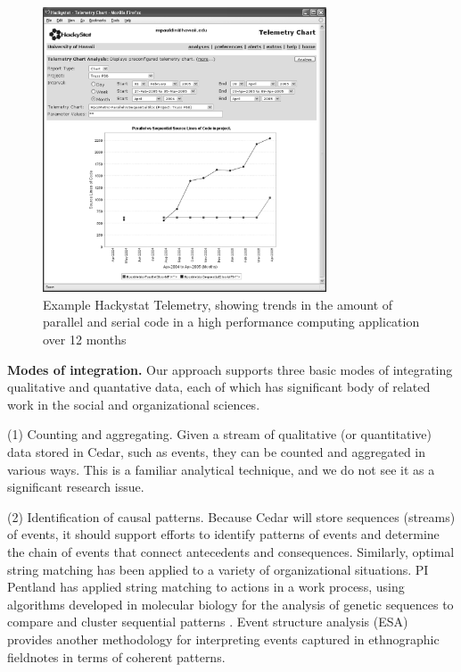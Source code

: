 \begin{figure}[ht]
  \centering
  \includegraphics[width=0.75\textwidth]{parallelsloc.eps}
  \caption{Example Hackystat Telemetry, showing trends in the amount of parallel and serial code 
in a high performance computing application over 12 months}
  \label{fig:telemetry}
\end{figure}

{\bf Modes of integration.}  Our approach supports three basic modes of
integrating qualitative and quantative data, each of which has significant
body of related work in the social and organizational sciences.

(1) Counting and aggregating. Given a stream of qualitative (or
quantitative) data stored in Cedar, such as events, they can be counted and
aggregated in various ways.  This is a familiar analytical technique, and
we do not see it as a significant research issue.

(2) Identification of causal patterns. Because Cedar will store sequences
(streams) of events, it should support efforts to identify patterns of
events and determine the chain of events that connect antecedents and
consequences. Similarly, optimal string matching
\cite{Abbott83,Abbott90a,Abbott90b,Abbott95,Sabherwal93} has been applied
to a variety of organizational situations. PI Pentland has applied string
matching to actions in a work process, using algorithms developed in
molecular biology for the analysis of genetic sequences to compare and
cluster sequential patterns \cite{Pentland03b}.  Event structure analysis
(ESA)
\cite{Heise89,Corsaro90,Griffin93,Griffin94,Stevenson03,Stevenson98,Stevenson00}
provides another methodology for interpreting events captured in
ethnographic fieldnotes in terms of coherent patterns.
 
